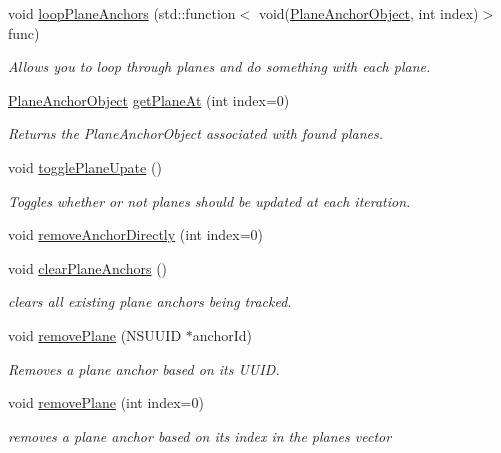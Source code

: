 \begin{DoxyCompactItemize}
void \mbox{\hyperlink{class_a_r_core_1_1_a_r_anchor_manager_a6f3215e085a92b1165b3da58138adbfc}{loop\+Plane\+Anchors}} (std\+::function$<$ void(\mbox{\hyperlink{struct_a_r_objects_1_1_plane_anchor_object}{Plane\+Anchor\+Object}}, int index)$>$ func)
\begin{DoxyCompactList}\small\item\em Allows you to loop through planes and do something with each plane. \end{DoxyCompactList}\item 
\mbox{\hyperlink{struct_a_r_objects_1_1_plane_anchor_object}{Plane\+Anchor\+Object}} \mbox{\hyperlink{class_a_r_core_1_1_a_r_anchor_manager_ac885fded5a2a2f5c0b58506786e069f1}{get\+Plane\+At}} (int index=0)
\begin{DoxyCompactList}\small\item\em Returns the Plane\+Anchor\+Object associated with found planes. \end{DoxyCompactList}\item 
void \mbox{\hyperlink{class_a_r_core_1_1_a_r_anchor_manager_a78da6cdbe64e12e49dc67adef5ac085b}{toggle\+Plane\+Upate}} ()
\begin{DoxyCompactList}\small\item\em Toggles whether or not planes should be updated at each iteration. \end{DoxyCompactList}\item 
void \mbox{\hyperlink{class_a_r_core_1_1_a_r_anchor_manager_aeaa578780e37129fb899b3f5a762af63}{remove\+Anchor\+Directly}} (int index=0)
\item 
void \mbox{\hyperlink{class_a_r_core_1_1_a_r_anchor_manager_aec308e2f34682a568b2bda022a21a3ed}{clear\+Plane\+Anchors}} ()
\begin{DoxyCompactList}\small\item\em clears all existing plane anchors being tracked. \end{DoxyCompactList}\item 
void \mbox{\hyperlink{class_a_r_core_1_1_a_r_anchor_manager_a65690e39286b733631eb52c8e740bc79}{remove\+Plane}} (N\+S\+U\+U\+ID $\ast$anchor\+Id)
\begin{DoxyCompactList}\small\item\em Removes a plane anchor based on it\textquotesingle{}s U\+U\+ID. \end{DoxyCompactList}\item 
void \mbox{\hyperlink{class_a_r_core_1_1_a_r_anchor_manager_a7d01736351089d31708ca4c577da99a4}{remove\+Plane}} (int index=0)
\begin{DoxyCompactList}\small\item\em removes a plane anchor based on it\textquotesingle{}s index in the planes vector \end{DoxyCompactList}\item 

\end{DoxyCompactItemize}
